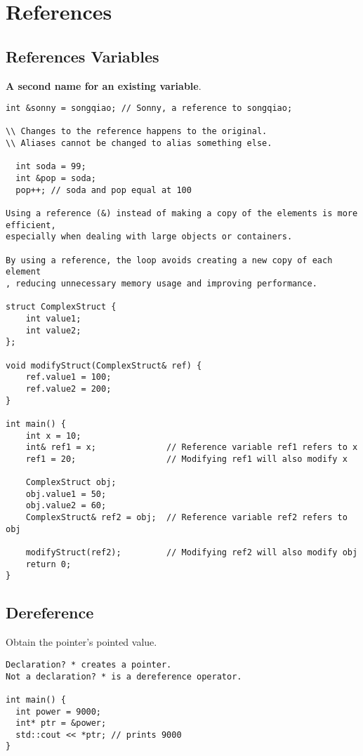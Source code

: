 \documentclass[openany]{report}
\begin{document}
\section{References}

\subsection{References Variables}

\textbf{A second name for an existing variable}.

\begin{verbatim}
int &sonny = songqiao; // Sonny, a reference to songqiao;

\\ Changes to the reference happens to the original.
\\ Aliases cannot be changed to alias something else.

  int soda = 99;
  int &pop = soda;
  pop++; // soda and pop equal at 100

Using a reference (&) instead of making a copy of the elements is more efficient,
especially when dealing with large objects or containers. 

By using a reference, the loop avoids creating a new copy of each element
, reducing unnecessary memory usage and improving performance.

struct ComplexStruct {
    int value1;
    int value2;
};

void modifyStruct(ComplexStruct& ref) {
    ref.value1 = 100;
    ref.value2 = 200;
}

int main() {
    int x = 10;
    int& ref1 = x;              // Reference variable ref1 refers to x
    ref1 = 20;                  // Modifying ref1 will also modify x

    ComplexStruct obj;
    obj.value1 = 50;
    obj.value2 = 60;
    ComplexStruct& ref2 = obj;  // Reference variable ref2 refers to obj

    modifyStruct(ref2);         // Modifying ref2 will also modify obj
    return 0;
}
\end{verbatim}

\subsection{Dereference}

Obtain the pointer's pointed value. 

\begin{verbatim}
Declaration? * creates a pointer.
Not a declaration? * is a dereference operator.

int main() {
  int power = 9000;
  int* ptr = &power;
  std::cout << *ptr; // prints 9000
}
\end{verbatim}
\end{document}
